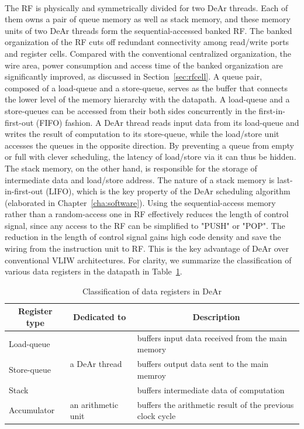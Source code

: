 \\\indent
The RF is physically and symmetrically divided for two DeAr threads.
Each of them owns a pair of queue memory as well as stack memory, 
and these memory units of two DeAr threads form the sequential-accessed banked RF.
The banked organization of the RF cuts off redundant connectivity among read/write ports and register cells.
Compared with the conventional centralized organization, 
the wire area, power consumption and access time of the banked organization are significantly improved, as discussed in Section~\ref{sec:rfcell}.
A queue pair, composed of a load-queue and a store-queue, 
serves as the buffer that connects the lower level of the memory hierarchy with the datapath.
A load-queue and a store-queues can be accessed from their both sides concurrently in the first-in-first-out (FIFO) fashion.
A DeAr thread reads input data from its load-queue and writes the result of computation to its store-queue, 
while the load/store unit accesses the queues in the opposite direction.
By preventing a queue from empty or full with clever scheduling, the latency of load/store via it can thus be hidden.
The stack memory, on the other hand, is responsible for the storage of intermediate data and load/store address.
The nature of a stack memory is last-in-first-out (LIFO), 
which is the key property of the DeAr scheduling algorithm (elaborated in Chapter~\ref{cha:software}).
Using the sequential-access memory rather than a random-access one in RF effectively reduces the length of control signal, 
since any access to the RF can be simplified to "PUSH" or "POP".
The reduction in the length of control signal gains high code density and save the wiring from the instruction unit to RF.
This is the key advantage of DeAr over conventional VLIW architectures.
For clarity, we summarize the classification of various data registers in the datapath in Table~\ref{tab:register}.
\begin{table}[!ht]
    \centering
    \begin{tabular}{|l|l|l|}
        \hline
        \multicolumn{1}{|c|}{\textbf{Register type}} & \multicolumn{1}{c|}{\textbf{Dedicated to}} & \multicolumn{1}{c|}{\textbf{Description}}                 \\ \hline
        Load-queue                                   & \multirow{3}{*}{a DeAr thread}             & buffers input data received from the main memory          \\ \cline{1-1} \cline{3-3} 
        Store-queue                                  &                                            & buffers output data sent to the main memroy               \\ \cline{1-1} \cline{3-3} 
        Stack                                        &                                            & buffers intermediate data of computation                  \\ \hline
        Accumulator                                  & an arithmetic unit                         & buffers the arithmetic result of the previous clock cycle \\ \hline
    \end{tabular}
    \caption{Classification of data registers in DeAr}
    \label{tab:register}
\end{table}
